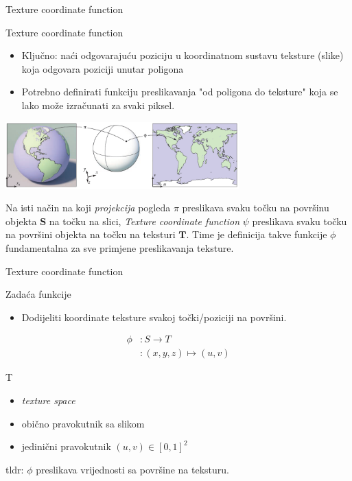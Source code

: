 \documentclass[9pt]{beamer}
\begin{document}
\begin{frame}{Texture coordinate function}
	\begin{block}{Texture coordinate function}
		\begin{itemize}
			\item Ključno: naći odgovarajuću poziciju u koordinatnom sustavu teksture (slike) koja odgovara poziciji unutar poligona
			\item Potrebno definirati funkciju preslikavanja "od poligona do teksture" koja se lako može izračunati za svaki piksel.
		\end{itemize}
	\end{block}
	\begin{center}
		\includegraphics[width=9cm]{slike/texture_coo_fun.png}
	\end{center}
	Na isti način na koji \textit{projekcija} pogleda $\pi$ preslikava svaku točku na površinu objekta $\mathbf{S}$ na točku na slici, \textit{Texture coordinate function} $\psi$ preslikava svaku točku na površini objekta na točku na teksturi $\mathbf{T}$. Time je definicija takve funkcije $\phi$ fundamentalna za sve primjene preslikavanja teksture.
\end{frame}

\begin{frame}{Texture coordinate function}
	\begin{block}{Zadaća funkcije}
		\begin{itemize}
			\item Dodijeliti koordinate teksture svakoj točki/poziciji na površini.
		\end{itemize}
		\begin{align*}
		\phi &: S \rightarrow T \\
		& : (x, y, z) \mapsto (u, v)
		\end{align*}
	\end{block}
	\begin{block}{T}
		\begin{itemize}
			\item \textit{texture space}
			\item obično pravokutnik sa slikom
			\item jedinični pravokutnik $(u, v) \in  \left[0, 1\right]^2$
		\end{itemize}
	\end{block}
	tldr: $\phi$ preslikava vrijednosti sa površine na teksturu.
\end{frame}
\end{document}
